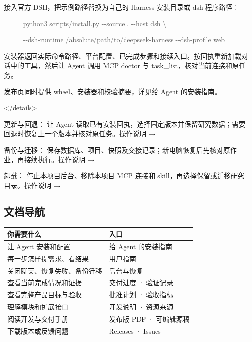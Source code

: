 \documentclass[11pt,a4paper]{ctexart}
\begin{document}
接入官方 DSH，把示例路径替换为自己的 Harness 安装目录或 dsh 程序路径：



\begin{quote}\small
python3 scripts/\allowbreak{}install.py -{}-source . -{}-host dsh \textbackslash{}\par
  -{}-dsh-runtime /\allowbreak{}absolute/\allowbreak{}path/\allowbreak{}to/\allowbreak{}deepseek-harness -{}-dsh-profile web\par
\end{quote}


安装器返回实际命令路径、平台配置、已完成步骤和接续入口。按回执重新加载对话中的工具，然后让 Agent 调用 MCP doctor 与 task\_\allowbreak{}list，核对当前连接和原任务。



发布页同时提供 wheel、安装器和校验摘要，详见给 Agent 的安装指南。



</\allowbreak{}details>



更新与回退： 让 Agent 读取已有安装回执，选择固定版本并保留研究数据；需要回退时恢复上一个版本并核对原任务。操作说明 →



备份与迁移： 保存数据库、项目、快照及交接记录；新电脑恢复后先核对原作业，再接续执行。操作说明 →



卸载： 停止本项目后台、移除本项目 MCP 连接和 skill，再选择保留或迁移研究目录。操作说明 →



\subsection{文档导航}


\begin{longtable}{p{7.25cm}p{7.25cm}}
\toprule
你需要什么 & 入口 \\
\midrule\endhead
让 Agent 安装和配置 & 给 Agent 的安装指南 \\
每一步怎样提需求、看结果 & 用户指南 \\
关闭聊天、恢复失败、备份迁移 & 后台与恢复 \\
查看当前完成情况和证据 & 交付进度 · 验证记录 \\
查看完整产品目标与验收 & 批准计划 · 验收指标 \\
理解模块和扩展接口 & 开发说明 · 资源来源 \\
阅读开发与交付手册 & 发布版 PDF · 可编辑源稿 \\
下载版本或反馈问题 & Releases · Issues \\
\bottomrule
\end{longtable}
\end{document}
